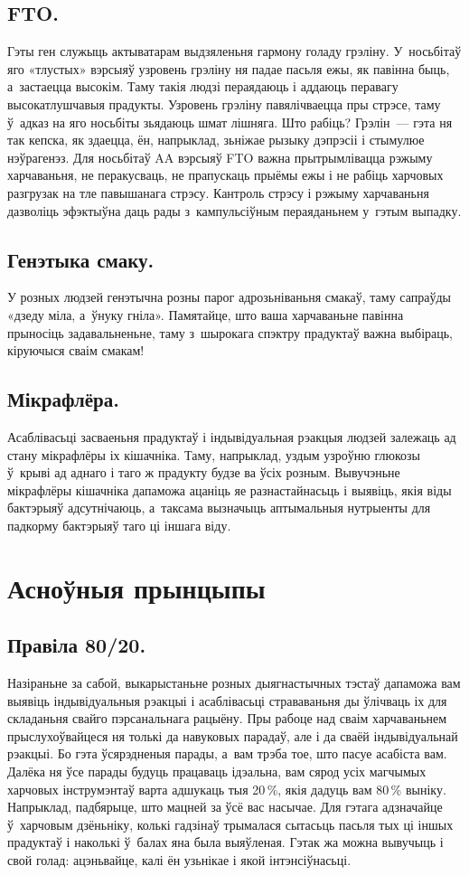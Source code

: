 \subsection{FTO.}
Гэты ген служыць актыватарам выдзяленьня гармону голаду грэліну. У~носьбітаў яго «тлустых» вэрсыяў узровень грэліну ня падае пасьля ежы, як павінна быць, а~застаецца высокім. Таму такія людзі пераядаюць і аддаюць перавагу высокатлушчавыя прадукты. Узровень грэліну павялічваецца пры стрэсе, таму ў~адказ на яго носьбіты зьядаюць шмат лішняга. Што рабіць? Грэлін~--- гэта ня так кепска, як здаецца, ён, напрыклад, зьніжае рызыку дэпрэсіі і стымулюе нэўрагенэз. Для носьбітаў AA вэрсыяў FTO важна прытрымлівацца рэжыму харчаваньня, не перакусваць, не прапускаць прыёмы ежы і не рабіць харчовых разгрузак на тле павышанага стрэсу. Кантроль стрэсу і рэжыму харчаваньня дазволіць эфэктыўна даць рады з~кампульсіўным пераяданьнем у~гэтым выпадку.

\subsection{Генэтыка смаку.}
У розных людзей генэтычна розны парог адрозьніваньня смакаў, таму сапраўды «дзеду міла, а~ўнуку гніла». Памятайце, што ваша харчаваньне павінна прыносіць задавальненьне, таму з~шырокага спэктру прадуктаў важна выбіраць, кіруючыся сваім смакам!

\subsection{Мікрафлёра.}
Асаблівасьці засваеньня прадуктаў і індывідуальная рэакцыя людзей залежаць ад стану мікрафлёры іх кішачніка. Таму, напрыклад, уздым узроўню глюкозы ў~крыві ад аднаго і таго ж прадукту будзе ва ўсіх розным. Вывучэньне мікрафлёры кішачніка дапаможа ацаніць яе разнастайнасьць і выявіць, якія віды бактэрыяў адсутнічаюць, а~таксама вызначыць аптымальныя нутрыенты для падкорму бактэрыяў таго ці іншага віду.

\section{Асноўныя прынцыпы}

\subsection{Правіла 80/20.}
Назіраньне за сабой, выкарыстаньне розных дыягнастычных тэстаў дапаможа вам выявіць індывідуальныя рэакцыі і асаблівасьці страваваньня ды ўлічваць іх для складаньня свайго пэрсанальнага рацыёну. Пры рабоце над сваім харчаваньнем прыслухоўвайцеся ня толькі да навуковых парадаў, але і да сваёй індывідуальнай рэакцыі. Бо гэта ўсярэдненыя парады, а~вам трэба тое, што пасуе асабіста вам. Далёка ня ўсе парады будуць працаваць ідэальна, вам сярод усіх магчымых харчовых інструмэнтаў варта адшукаць тыя 20\,\%, якія дадуць вам 80\,\% выніку. Напрыклад, падбярыце, што мацней за ўсё вас насычае. Для гэтага адзначайце ў~харчовым дзёньніку, колькі гадзінаў трымалася сытасьць пасьля тых ці іншых прадуктаў і наколькі ў~балах яна была выяўленая. Гэтак жа можна вывучыць і свой голад: ацэньвайце, калі ён узьнікае і якой інтэнсіўнасьці.

